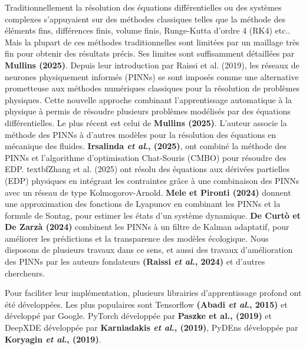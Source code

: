 \documentclass[12pt, oneside]{report} %
\theoremstyle{definition}
\theoremstyle{remark}
\begin{document}
	Traditionnellement la résolution des équations différentielles ou des systèmes complexes s'appuyaient sur des méthodes classiques telles que la méthode des éléments fins, différences finis, volume finis, Runge-Kutta d'ordre 4 (RK4) etc.. Mais la plupart de ces méthodes traditionnelles sont limitées par un maillage très fin pour obtenir des résultats précis. Ses limites sont suffisamment détaillées par \textbf{Mullins (2025)}. Depuis leur introduction par Raissi et al. (2019), les réseaux de neurones physiquement informés (PINNs) se sont imposés comme une alternative prometteuse aux méthodes numériques classiques pour la résolution de problèmes physiques. Cette nouvelle approche combinant l'apprentissage automatique à la physique à permis de résoudre plusieurs problèmes modélisés par des équations différentielles. Le plus récent est celui de \textbf{Mullins (2025)}. L'auteur associe la méthode des PINNs à d'autres modèles pour la résolution des équations en mécanique des fluides. \textbf{Irsalinda \textit{et al}., (2025)}, ont combiné la méthode des PINNs et l'algorithme d'optimisation Chat-Souris (CMBO) pour résoudre des EDP. textbf{Zhang et al. (2025)} ont résolu des équations aux dérivées partielles (EDP) physiques en intégrant les contraintes grâce à une combinaison des PINNs avec un réseau de type Kolmogorov-Arnold. \textbf{Mele et Pironti (2024)} donnent une approximation des fonctions de Lyapunov en combinant les PINNs et la formule de Sontag, pour estimer les états d'un système dynamique. \textbf{De Curtò et De Zarzà (2024)} combinent les PINNs à un filtre de Kalman adaptatif, pour améliorer les prédictions et la transparence des modèles écologique. Nous disposons de plusieurs travaux dans ce sens, et aussi des travaux d'amélioration des PINNs par les auteurs fondateurs \textbf{(Raissi \textit{et al}., 2024)} et d'autres chercheurs. \
	
	Pour faciliter leur implémentation, plusieurs librairies d'apprentissage profond ont été développées. Les plus populaires sont Tensorflow \textbf{(Abadi \textit{et al}., 2015)} et développé par Google. PyTorch développée par \textbf{Paszke {et al}., (2019)} et  DeepXDE développée par \textbf{Karniadakis \textit{et al}., (2019)}, PyDEns développée par \textbf{Koryagin \textit{et al}., (2019)}. %
		
\end{document}
